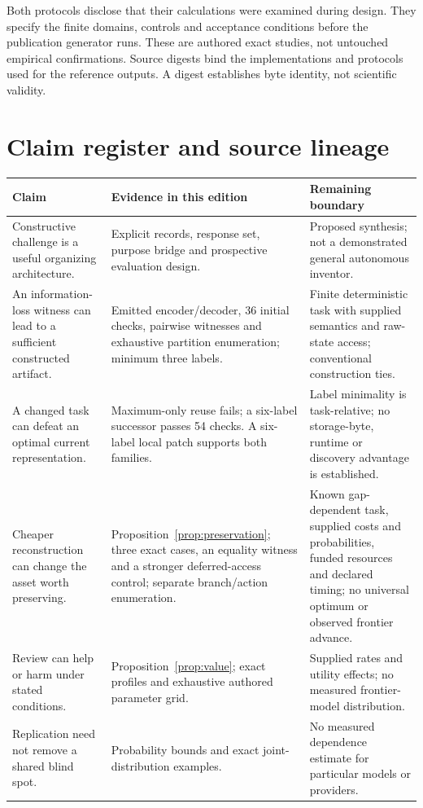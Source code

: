 Both protocols disclose that their calculations were examined during design. They specify the finite domains, controls and acceptance conditions before the publication generator runs. These are authored exact studies, not untouched empirical confirmations. Source digests bind the implementations and protocols used for the reference outputs. A digest establishes byte identity, not scientific validity.

\section{Claim register and source lineage}
\label{app:claims}
\begin{longtable}{P{1.55in}P{2.32in}P{2.05in}}
\toprule
\textbf{Claim} & \textbf{Evidence in this edition} & \textbf{Remaining boundary}\\
\midrule\endhead
Constructive challenge is a useful organizing architecture. & Explicit records, response set, purpose bridge and prospective evaluation design. & Proposed synthesis; not a demonstrated general autonomous inventor.\\
An information-loss witness can lead to a sufficient constructed artifact. & Emitted encoder/decoder, 36 initial checks, pairwise witnesses and exhaustive partition enumeration; minimum three labels. & Finite deterministic task with supplied semantics and raw-state access; conventional construction ties.\\
A changed task can defeat an optimal current representation. & Maximum-only reuse fails; a six-label successor passes 54 checks. A six-label local patch supports both families. & Label minimality is task-relative; no storage-byte, runtime or discovery advantage is established.\\
Cheaper reconstruction can change the asset worth preserving. & Proposition~\ref{prop:preservation}; three exact cases, an equality witness and a stronger deferred-access control; separate branch/action enumeration. & Known gap-dependent task, supplied costs and probabilities, funded resources and declared timing; no universal optimum or observed frontier advance.\\
Review can help or harm under stated conditions. & Proposition~\ref{prop:value}; exact profiles and exhaustive authored parameter grid. & Supplied rates and utility effects; no measured frontier-model distribution.\\
Replication need not remove a shared blind spot. & Probability bounds and exact joint-distribution examples. & No measured dependence estimate for particular models or providers.\\

\end{longtable}
